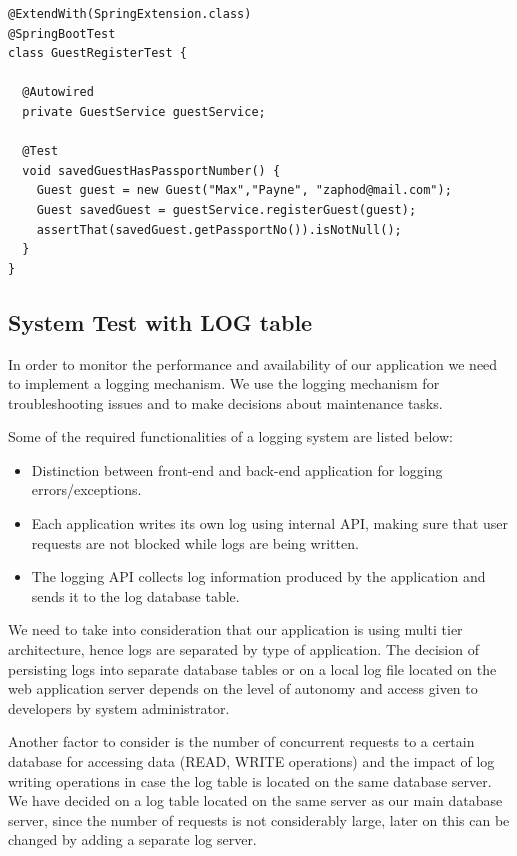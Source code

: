 \begin{verbatim}
@ExtendWith(SpringExtension.class)
@SpringBootTest
class GuestRegisterTest {

  @Autowired
  private GuestService guestService;

  @Test
  void savedGuestHasPassportNumber() {
    Guest guest = new Guest("Max","Payne", "zaphod@mail.com");
    Guest savedGuest = guestService.registerGuest(guest);
    assertThat(savedGuest.getPassportNo()).isNotNull();
  }
}
\end{verbatim}


\subsection{System Test with LOG table}
In order to monitor the performance and availability of our application we need to implement a logging mechanism. We use the logging mechanism for troubleshooting issues and to make decisions about maintenance tasks.

Some of the required functionalities of a logging system are listed below:
\begin{itemize}
    \item Distinction between front-end and back-end application for logging errors/exceptions.
    \item Each application writes its own log using internal API, making sure that user requests are not blocked while logs are being written.
    \item The logging API collects log information produced by the application and sends it to the log database table.
\end{itemize}

We need to take into consideration that our application is using multi tier architecture, hence logs are separated by type of application. The decision of persisting logs into separate database tables or on a local log file located on the web application server depends on the level of autonomy and access given to developers by system administrator.

Another factor to consider is the number of concurrent requests to a certain database for accessing data (READ, WRITE operations) and the impact of log writing operations in case the log table is located on the same database server. We have decided on a log table located on the same server as our main database server, since the number of requests is not considerably large, later on this can be changed by adding a separate log server.

